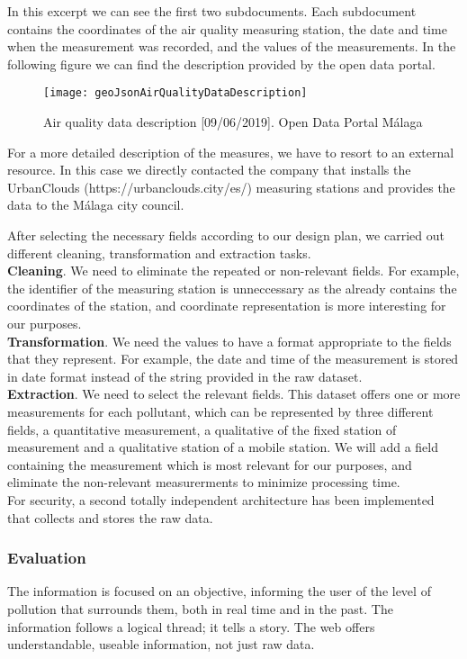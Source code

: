     In this excerpt we can see the first two subdocuments. Each subdocument contains the coordinates of the air quality 
    measuring station, the date and time when the measurement was recorded, and the values of the measurements.
    In the following figure we can find the description provided by the open data portal.\\
    
\begin{figure}[ht]
    \centering
    \texttt{[image: geoJsonAirQualityDataDescription]}
    \caption{Air quality data description [09/06/2019]. Open Data Portal Málaga}
\end{figure}

For a more detailed description of the measures, we have to resort to an external resource. In this case we directly contacted 
the company that installs the UrbanClouds (https://urbanclouds.city/es/) measuring stations and provides the data 
to the Málaga city council.

After selecting the necessary fields according to our design plan, we carried out different cleaning, transformation and extraction tasks. \\

\textbf{Cleaning}. We need to eliminate the repeated or non-relevant fields. For example, the identifier of the measuring station is 
unneccessary as the  already contains the coordinates of the station, and coordinate representation is more interesting for our purposes. \\

\textbf{Transformation}. We need the values to have a format appropriate to the fields that they represent. For example, the date and time 
of the measurement is stored in date format
instead of the string provided in the raw dataset. \\

\textbf{Extraction}. We need to select the relevant fields. This dataset offers one or more measurements for each pollutant, which can be 
represented by three different fields, a
quantitative measurement, a qualitative of the fixed station of measurement and a qualitative station of a mobile station. We will add a 
field containing the measurement which is most relevant for our purposes, and eliminate the non-relevant measurerments to minimize processing time. \\

For security, a second totally independent architecture has been implemented that collects and stores the raw data.


\subsubsection*{Evaluation}  

\begin{itemize}
    \done The information is focused on an objective, informing the user of the level of pollution that surrounds them, both  in real time
    and in the past.
    \done The information follows a logical thread; it tells a story.
    \done The web offers understandable, useable information, not just raw data.
\end{itemize}